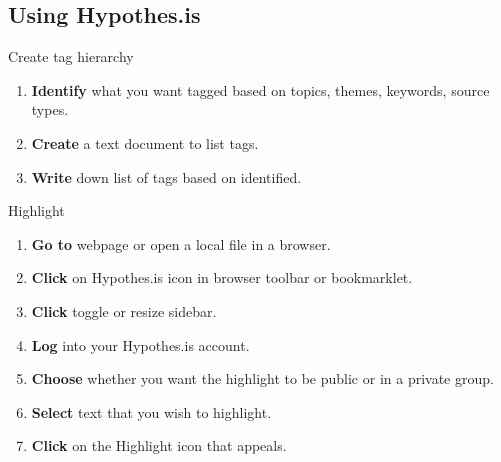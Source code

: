 \documentclass[10pt,a4paper]{article}
\begin{document}
\subsection{Using Hypothes.is}

\begin{textbox}{Create tag hierarchy}
 

  

\begin{enumerate}
\item \textbf{Identify} what you want tagged based on topics, themes, keywords, source types. 
\item \textbf{Create} a text document to list tags.
\item \textbf{Write} down list of tags based on identified.
\end{enumerate}

\end{textbox}


\begin{textbox}{Highlight}
 

  

\begin{enumerate}
\item \textbf{Go to} webpage or open a local file in a browser. 
\item \textbf{Click} on Hypothes.is icon in browser toolbar or bookmarklet.
\item \textbf{Click} toggle or resize sidebar.
\item \textbf{Log} into your Hypothes.is account.
\item \textbf{Choose} whether you want the highlight to be public or in a private group.
\item \textbf{Select} text that you wish to highlight.
\item \textbf{Click} on the Highlight icon that appeals.

\end{enumerate}

\end{textbox}
\end{document}
